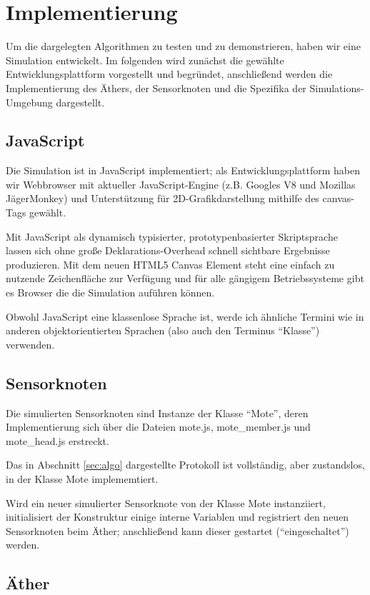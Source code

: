 \section{Implementierung} \label{sec:impl}

Um die dargelegten Algorithmen zu testen und zu demonstrieren, haben wir
eine Simulation entwickelt. Im folgenden wird zunächst die gewählte
Entwicklungsplattform vorgestellt und begründet, anschließend werden die
Implementierung des Äthers, der Sensorknoten und die Spezifika der
Simulations-Umgebung dargestellt.

\subsection{JavaScript}

Die Simulation ist in JavaScript implementiert; als
Entwicklungsplattform haben wir Webbrowser mit aktueller
JavaScript-Engine (z.B. Googles V8 und Mozillas JägerMonkey) und
Unterstützung für 2D-Grafikdarstellung mithilfe des canvas-Tags gewählt.

Mit JavaScript als dynamisch typisierter, prototypenbasierter
Skriptsprache lassen sich ohne große Deklarations-Overhead schnell
sichtbare Ergebnisse produzieren. Mit dem neuen HTML5 Canvas Element
steht eine einfach zu nutzende Zeichenfläche zur Verfügung und für alle
gängigem Betriebssysteme gibt es Browser die die Simulation auführen
können.

Obwohl JavaScript eine klassenlose Sprache ist, werde ich ähnliche
Termini wie in anderen objektorientierten Sprachen (also auch den
Terminus ``Klasse'') verwenden.

\subsection{Sensorknoten}

Die simulierten Sensorknoten sind Instanze der Klasse ``Mote'', deren
Implementierung sich über die Dateien mote.js, mote\_member.js und
mote\_head.js erstreckt.

Das in Abschnitt \ref{sec:algo} dargestellte Protokoll ist vollständig, aber
zustandslos, in der Klasse Mote implememtiert.

Wird ein neuer simulierter Sensorknote von der Klasse Mote instanziiert,
initialisiert der Konstruktur einige interne Variablen und registriert
den neuen Sensorknoten beim Äther; anschließend kann dieser gestartet
(``eingeschaltet'') werden.

\subsection{Äther}

